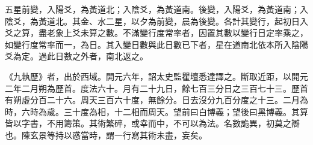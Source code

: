 \begin{pinyinscope}
 五星前變，入陽爻，為黃道北；入陰爻，為黃道南。後變，入陽爻，為黃道南；入陰爻，為黃道北。其金、水二星，以夕為前變，晨為後變。各計其變行，起初日入爻之算，盡老象上爻未算之數。不滿變行度常率者，因置其數以變行日定率乘之，如變行度常率而一，為日。其入變日數與此日數已下者，星在道南北依本所入陰陽爻為定。過此日數之外者，南北返之。



 《九執歷》者，出於西域。開元六年，詔太史監瞿壇悉達譯之。斷取近距，以開元二年二月朔為歷首。度法六十。月有二十九日，餘七百三分日之三百七十三。歷首有朔虛分百二十六。周天三百六十度，無餘分。日去沒分九百分度之十三。二月為時，六時為歲。三十度為相，十二相而周天。望前曰白博義；望後曰黑博義。其算皆以字書，不用籌策。其術繁碎，或幸而中，不可以為法。名數詭異，初莫之辯也。陳玄景等持以惑當時，謂一行寫其術未盡，妄矣。



\end{pinyinscope}